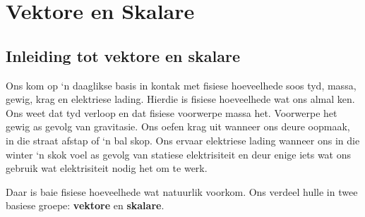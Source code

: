          \chapter{Vektore en Skalare}\label{chap:vectors}
    \setcounter{figure}{1}
    \setcounter{subfigure}{1}
    \label{59e414b70efc194a27a122db47d06ce6}
         \section{Inleiding tot vektore en skalare}
    \nopagebreak
Ons kom op ‘n daaglikse basis in kontak met fisiese hoeveelhede soos tyd, massa, gewig, krag en elektriese lading. Hierdie is fisiese hoeveelhede wat ons almal ken. Ons weet dat tyd verloop en dat fisiese voorwerpe massa het. Voorwerpe het gewig as gevolg van gravitasie. Ons oefen krag uit wanneer ons deure oopmaak, in die straat afstap of ‘n bal skop. Ons ervaar elektriese lading wanneer ons in die winter ‘n skok voel as gevolg van statiese elektrisiteit en deur enige iets wat ons gebruik wat elektrisiteit nodig het om te werk.

Daar is baie fisiese hoeveelhede wat natuurlik voorkom. Ons verdeel hulle in twee basiese groepe: \textbf{vektore} en \textbf{skalare}.\\

